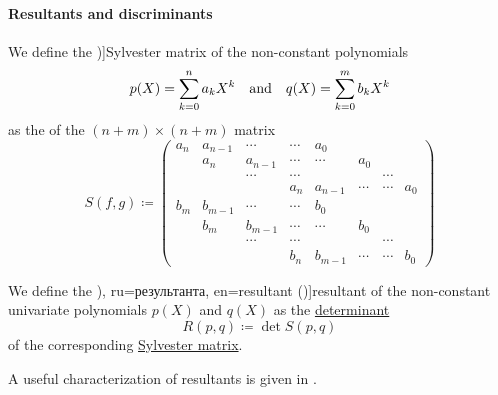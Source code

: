 \paragraph{Resultants and discriminants}

\begin{definition}\label{def:sylvester_matrix}
  We define the \term[ru=матрица Сильвестра, en=Sylvester's matrix (\cite[def. 3.6.2]{CoxLittleOShea2015AlgGeometry})]{Sylvester matrix} of the non-constant polynomials
  \begin{align*}
    p(X) = \sum_{k=0}^n a_k X^k
    &&\T{and}&&
    q(X) = \sum_{k=0}^m b_k X^k
  \end{align*}
  as the  of the \( (n + m) \times (n + m) \) matrix
  \begin{equation*}
    S(f, g) \coloneqq
    \begin{pmatrix}
      a_n    & a_{n-1} & \cdots  & \cdots  & a_0     &        &        &        \\
             & a_n     & a_{n-1} & \cdots  & \cdots  & a_0    &        &        \\
             &         & \cdots  & \cdots  &         &        & \cdots &        \\
             &         &         & a_n     & a_{n-1} & \cdots & \cdots & a_0    \\
      b_m    & b_{m-1} & \cdots  & \cdots  & b_0     &        &        &        \\
             & b_m     & b_{m-1} & \cdots  & \cdots  & b_0    &        &        \\
             &         & \cdots  & \cdots  &         &        & \cdots &        \\
             &         &         & b_n     & b_{m-1} & \cdots & \cdots & b_0
    \end{pmatrix}
  \end{equation*}
\end{definition}

\begin{definition}\label{def:resultant}
  We define the \term[bg=резултанта (\cite[198]{Обрешков1962ВисшаАлгебра}), ru=результанта, en=resultant (\cite[def. 3.6.2]{CoxLittleOShea2015AlgGeometry})]{resultant} of the non-constant univariate polynomials \( p(X) \) and \( q(X) \) as the \hyperref[def:matrix_determinant]{determinant}
  \begin{equation*}
    R(p, q) \coloneqq \det S(p, q)
  \end{equation*}
  of the corresponding \hyperref[def:sylvester_matrix]{Sylvester matrix}.
\end{definition}
\begin{comments}
  \item A useful characterization of resultants is given in .
\end{comments}

